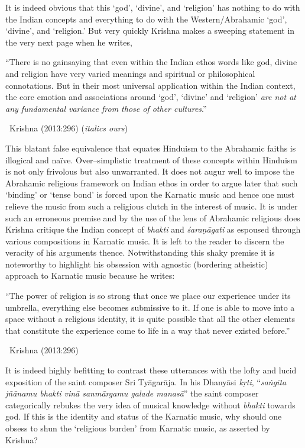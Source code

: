 It is indeed obvious that this ‘god’, ‘divine’, and ‘religion’ has nothing to do with the Indian concepts and everything to do with the Western/Abrahamic ‘god’, ‘divine’, and ‘religion.’ But very quickly Krishna makes a sweeping statement in the very next page when he writes,

\begin{myquote}
“There is no gainsaying that even within the Indian ethos words like god, divine and religion have very varied meanings and spiritual or philosophical connotations. But in their most universal application within the Indian context, the core emotion and associations around ‘god’, ‘divine’ and ‘religion’ \textit{are not at any fundamental variance from those of other cultures}.” 

~\hfill Krishna (2013:296) (\textit{italics ours})
\end{myquote}

This blatant false equivalence that equates Hinduism to the Abrahamic faiths is illogical and naïve. Over–simplistic treatment of these concepts within Hinduism is not only frivolous but also unwarranted. It does not augur well to impose the Abrahamic religious framework on Indian ethos in order to argue later that such ‘binding’ or ‘tense bond’ is forced upon the Karnatic music and hence one must relieve the music from such a religious clutch in the interest of music. It is under such an erroneous premise and by the use of the lens of Abrahamic religious does Krishna critique the Indian concept of \textit{bhakti} and \textit{śaraṇāgati }as espoused through various compositions in Karnatic music. It is left to the reader to discern the veracity of his arguments thence. Notwithstanding this shaky premise it is noteworthy to highlight his obsession with agnostic (bordering atheistic) approach to Karnatic music because he writes:

\begin{myquote}
“The power of religion is so strong that once we place our experience under its umbrella, everything else becomes submissive to it. If one is able to move into a space without a religious identity, it is quite possible that all the other elements that constitute the experience come to life in a way that never existed before.” 

~\hfill Krishna (2013:296)
\end{myquote}

It is indeed highly befitting to contrast these utterances with the lofty and lucid exposition of the saint composer Sri Tyāgarāja. In his Dhanyāsi\textit{ kṛti}, “\textit{saṅgīta jñānamu bhakti vinā sanmārgamu galade manasā}” the saint composer categorically rebukes the very idea of musical knowledge without \textit{bhakti} towards god. If this is the identity and status of the Karnatic music, why should one obsess to shun the ‘religious burden’ from Karnatic music, as asserted by Krishna?


